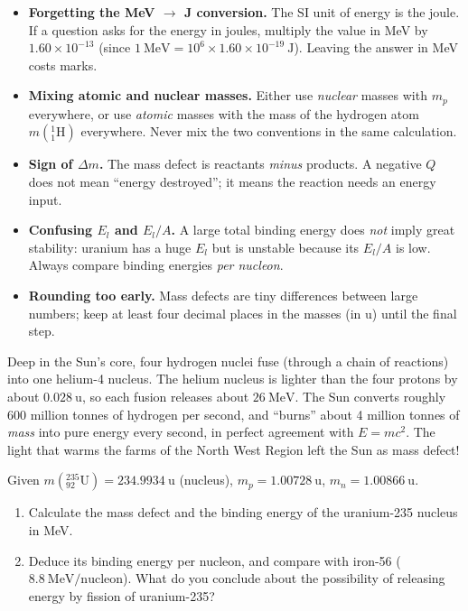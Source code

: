 \documentclass[11pt]{article}
\begin{document}
\begin{attention}
\begin{itemize}
\item \textbf{Forgetting the MeV $\to$ J conversion.} The SI unit of energy is the joule. If a question asks for the energy in joules, multiply the value in MeV by $1.60\times 10^{-13}$ (since $1\ \mathrm{MeV} = 10^{6}\times 1.60\times 10^{-19}\ \mathrm{J}$). Leaving the answer in MeV costs marks.
\item \textbf{Mixing atomic and nuclear masses.} Either use \emph{nuclear} masses with $m_p$ everywhere, or use \emph{atomic} masses with the mass of the hydrogen atom $m(\ensuremath{\mathrm{^{1}_{1}H}})$ everywhere. Never mix the two conventions in the same calculation.
\item \textbf{Sign of $\Delta m$.} The mass defect is reactants \emph{minus} products. A negative $Q$ does not mean ``energy destroyed''; it means the reaction needs an energy input.
\item \textbf{Confusing $E_l$ and $E_l/A$.} A large total binding energy does \emph{not} imply great stability: uranium has a huge $E_l$ but is unstable because its $E_l/A$ is low. Always compare binding energies \emph{per nucleon}.
\item \textbf{Rounding too early.} Mass defects are tiny differences between large numbers; keep at least four decimal places in the masses (in u) until the final step.
\end{itemize}
\end{attention}

\begin{savaistu}
Deep in the Sun's core, four hydrogen nuclei fuse (through a chain of reactions) into one helium-4 nucleus. The helium nucleus is lighter than the four protons by about $0.028\ \mathrm{u}$, so each fusion releases about $26\ \mathrm{MeV}$. The Sun converts roughly 600 million tonnes of hydrogen per second, and ``burns'' about 4 million tonnes of \emph{mass} into pure energy every second, in perfect agreement with $E = mc^2$. The light that warms the farms of the North West Region left the Sun as mass defect!
\end{savaistu}

\begin{exercice}
Given $m(\ensuremath{\mathrm{^{235}_{92}U}}) = 234.9934\ \mathrm{u}$ (nucleus), $m_p = 1.00728\ \mathrm{u}$, $m_n = 1.00866\ \mathrm{u}$.
\begin{enumerate}
\item Calculate the mass defect and the binding energy of the uranium-235 nucleus in MeV.
\item Deduce its binding energy per nucleon, and compare with iron-56 ($8.8\ \mathrm{MeV/nucleon}$). What do you conclude about the possibility of releasing energy by fission of uranium-235?
\end{enumerate}
\end{exercice}
\end{document}
